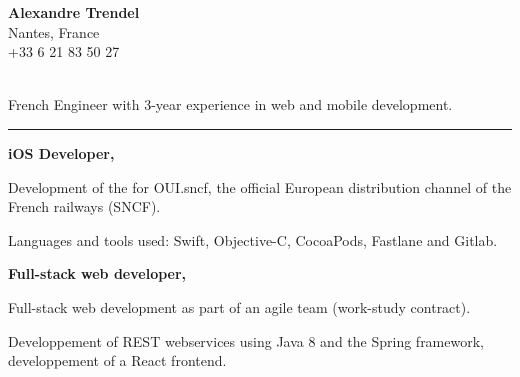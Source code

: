 \documentclass{cv}
\begin{document}
\pagestyle{empty}

\noindent\begin{minipage}[t]{0.3\textwidth}

\textbf{\large Alexandre Trendel} \\
Nantes, France \\
 +33 6 21 83 50 27 \\
 \href{mailto:${INFO_EMAIL}}{} \\
 \href{https://github.com/xou816}{}

\end{minipage}
\hfill
\begin{minipage}[t]{0.5\textwidth}

\large

French Engineer with 3-year experience in web and mobile development.

\begin{center}\color{solred}\rule{2cm}{1pt}\end{center}

\end{minipage}

\vspace{1cm}


\begin{mainexpbox}[title=nov. 2019 -- today]

	\begin{minipage}[c]{20mm}
	\end{minipage}
	\begin{minipage}[c]{0.8\textwidth}

	\textbf{iOS Developer, \evtech{}}

	Development of the \href{https://apps.apple.com/fr/app/oui-sncf-train-et-bus/id343889987}{} for OUI.sncf, the official European distribution channel of the French railways (SNCF).

	Languages and tools used: Swift, Objective-C, CocoaPods, Fastlane and Gitlab.
	\end{minipage}

\end{mainexpbox}

\begin{expbox}[title={dec. 2016, \faicon{clock-o} 3 years}]

	\begin{minipage}[c]{20mm}
	\end{minipage}
	\begin{minipage}[c]{0.8\textwidth}

	\textbf{Full-stack web developer, \evtech{}}

	Full-stack web development as part of an agile team (work-study contract).

	Developpement of REST webservices using Java 8 and the Spring framework, developpement of a React frontend.
	\end{minipage}

\end{expbox}
\end{document}
